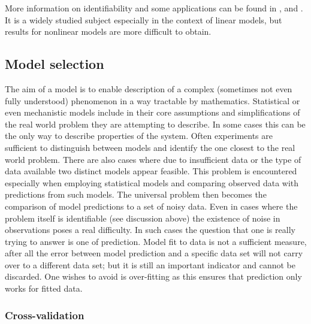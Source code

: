 More information on identifiability and some applications can be found in \cite{Saccomani:2003kx},  \cite{Saccomani:2010by} and \cite{Jacquez:1985fz}. It is a widely studied subject especially in the context of linear models, but results for nonlinear models are more difficult to obtain.

\subsection{Model selection}
\label{sec:model-selection-1}

The aim of a model is to enable description of a complex (sometimes not even fully understood) phenomenon in a way tractable by mathematics. Statistical or even mechanistic models include in their core assumptions and simplifications of the real world problem they are attempting to describe. In some cases this can be the only way to describe properties of the system. Often experiments are sufficient to distinguish between models and identify the one closest to the real world problem. There are also cases where due to insufficient data or the type of data available two distinct models appear feasible. This problem is encountered especially when employing statistical models and comparing observed data with predictions from such models. The universal problem then becomes the comparison of model predictions to a set of noisy data. Even in cases where the problem itself is identifiable (see discussion above) the existence of noise in observations poses a real difficulty. In such cases the question that one is really trying to answer is one of prediction. Model fit to data is not a sufficient measure, after all the error between model prediction and a specific data set will not carry over to a different data set; but it is still an important indicator and cannot be discarded.  One wishes to avoid is over-fitting as this ensures that prediction only works for fitted data.

\subsubsection{Cross-validation}
\label{sec:cross-validation}

